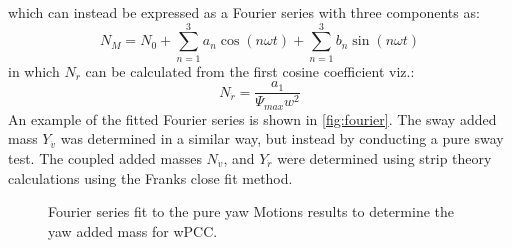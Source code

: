 \begin{equation}
    
    \label{eq:MOTIONS_N_expanded}
\end{equation}
which can instead be expressed as a Fourier series with three components as:
\begin{equation}
    N_M = N_0 + \sum_{n=1}^3a_n \cos(n \omega t) + \sum_{n=1}^3b_n \sin(n \omega t) 
    \label{eq:fourier}
\end{equation}
in which $N_{\dot{r}}$ can be calculated from the first cosine coefficient viz.:
\begin{equation}
    N_{\dot{r}} = \frac{a_1}{\Psi_{max} w^{2}}
    \label{eq:N_r1d}
\end{equation}
An example of the fitted Fourier series is shown in \autoref{fig:fourier}. The sway added mass $Y_{\dot{v}}$ was determined in a similar way, but instead by conducting a pure sway test. The coupled added masses $N_{\dot{v}}$, and $Y_{\dot{r}}$ were determined using strip theory calculations using the Franks close fit method. 
\begin{figure}[h!]
    \centering   
    \caption{Fourier series fit to the pure yaw Motions results to determine the yaw added mass for wPCC.}
    \label{fig:fourier}
\end{figure}